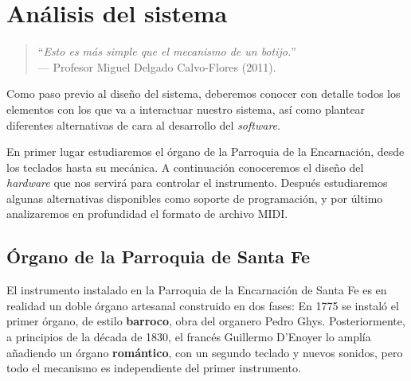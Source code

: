 \chapter{Análisis del sistema}
\label{cap:capitulo_3}

\begin{quote}
	\small \flushright ``\textit{Esto es más simple que el mecanismo de un botijo.}'' \\
	--- Profesor Miguel Delgado Calvo-Flores (2011).
\end{quote}

\vspace{8em}

Como paso previo al diseño del sistema, deberemos conocer con detalle todos los elementos con los que va a interactuar nuestro sistema, así como plantear diferentes alternativas de cara al desarrollo del \textit{software}.

En primer lugar estudiaremos el órgano de la Parroquia de la Encarnación, desde los teclados hasta su mecánica. A continuación conoceremos el diseño del \textit{hardware} que nos servirá para controlar el instrumento. Después estudiaremos algunas alternativas disponibles como soporte de programación, y por último analizaremos en profundidad el formato de archivo \acrshort{MIDI}.

\newpage

\section{Órgano de la Parroquia de Santa Fe}

El instrumento instalado en la Parroquia de la Encarnación de Santa Fe es en realidad un doble órgano artesanal construido en dos fases: En 1775 se instaló el primer órgano, de estilo \textbf{barroco}, obra del organero Pedro Ghys. Posteriormente, a principios de la década de 1830, el francés Guillermo D'Enoyer lo amplía añadiendo un órgano \textbf{romántico}, con un segundo teclado y nuevos sonidos, pero todo el mecanismo es independiente del primer instrumento.

\smallskip

